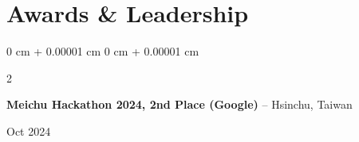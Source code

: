 \documentclass[10pt, letterpaper]{article}
\newenvironment{highlights}{
    \begin{itemize}[
        topsep=0.10 cm,
        parsep=0.10 cm,
        partopsep=0pt,
        itemsep=0pt,
        leftmargin=0 cm + 10pt
    ]
}{
    \end{itemize}
} %
\newenvironment{onecolentry}{
    \begin{adjustwidth}{
        0 cm + 0.00001 cm
    }{
        0 cm + 0.00001 cm
    }
}{
    \end{adjustwidth}
} %
\newenvironment{twocolentry}[2][]{
    \onecolentry
    \def\secondColumn{#2}
    \setcolumnwidth{\fill, 5.2 cm}
    \begin{paracol}{2}
}{
    \switchcolumn \raggedleft \secondColumn
    \end{paracol}
    \endonecolentry
} %
\begin{document}
    
    
    \section{Awards \&  Leadership}

    
    
    
    \begin{twocolentry}{
        Oct 2024
    }
        \textbf{Meichu Hackathon 2024, 2nd Place (Google)} -- Hsinchu, Taiwan
    \end{twocolentry}
    
\end{document}
